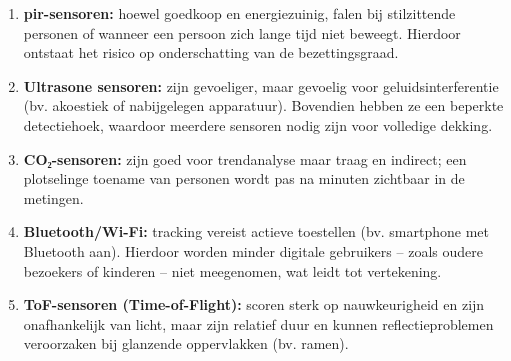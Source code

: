 \begin{enumerate}
    \item{\textbf{\gls{pir}-sensoren:} hoewel goedkoop en energiezuinig, falen bij stilzittende personen of wanneer een persoon zich lange tijd niet beweegt. Hierdoor ontstaat het risico op onderschatting van de bezettingsgraad.}
    \item{\textbf{Ultrasone sensoren:} zijn gevoeliger, maar gevoelig voor geluidsinterferentie (bv. akoestiek of nabijgelegen apparatuur). Bovendien hebben ze een beperkte detectiehoek, waardoor meerdere sensoren nodig zijn voor volledige dekking.}
    \item{\textbf{CO₂-sensoren:} zijn goed voor trendanalyse maar traag en indirect; een plotselinge toename van personen wordt pas na minuten zichtbaar in de metingen.}
    \item{\textbf{Bluetooth/Wi-Fi:} tracking vereist actieve toestellen (bv. smartphone met Bluetooth aan). Hierdoor worden minder digitale gebruikers – zoals oudere bezoekers of kinderen – niet meegenomen, wat leidt tot vertekening.}
    \item{\textbf{ToF-sensoren (Time-of-Flight):} scoren sterk op nauwkeurigheid en zijn onafhankelijk van licht, maar zijn relatief duur en kunnen reflectieproblemen veroorzaken bij glanzende oppervlakken (bv. ramen).}
\end{enumerate}


